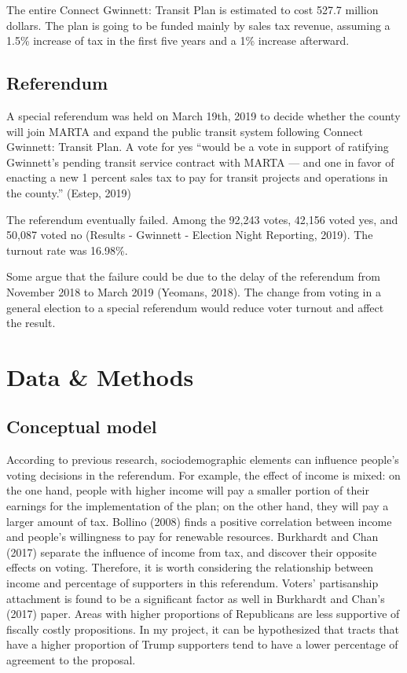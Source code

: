 \documentclass[
]{article}
\begin{document}
The entire Connect Gwinnett: Transit Plan is estimated to cost 527.7
million dollars. The plan is going to be funded mainly by sales tax
revenue, assuming a 1.5\% increase of tax in the first five years and a
1\% increase afterward.

\hypertarget{referendum}{%
\subsection{Referendum}\label{referendum}}

A special referendum was held on March 19th, 2019 to decide whether the
county will join MARTA and expand the public transit system following
Connect Gwinnett: Transit Plan. A vote for yes ``would be a vote in
support of ratifying Gwinnett's pending transit service contract with
MARTA --- and one in favor of enacting a new 1 percent sales tax to pay
for transit projects and operations in the county.'' (Estep, 2019)

The referendum eventually failed. Among the 92,243 votes, 42,156 voted
yes, and 50,087 voted no (Results - Gwinnett - Election Night Reporting,
2019). The turnout rate was 16.98\%.

Some argue that the failure could be due to the delay of the referendum
from November 2018 to March 2019 (Yeomans, 2018). The change from voting
in a general election to a special referendum would reduce voter turnout
and affect the result.

\hypertarget{data-methods}{%
\section{Data \& Methods}\label{data-methods}}

\hypertarget{conceptual-model}{%
\subsection{Conceptual model}\label{conceptual-model}}

According to previous research, sociodemographic elements can influence
people's voting decisions in the referendum. For example, the effect of
income is mixed: on the one hand, people with higher income will pay a
smaller portion of their earnings for the implementation of the plan; on
the other hand, they will pay a larger amount of tax. Bollino (2008)
finds a positive correlation between income and people's willingness to
pay for renewable resources. Burkhardt and Chan (2017) separate the
influence of income from tax, and discover their opposite effects on
voting. Therefore, it is worth considering the relationship between
income and percentage of supporters in this referendum. Voters'
partisanship attachment is found to be a significant factor as well in
Burkhardt and Chan's (2017) paper. Areas with higher proportions of
Republicans are less supportive of fiscally costly propositions. In my
project, it can be hypothesized that tracts that have a higher
proportion of Trump supporters tend to have a lower percentage of
agreement to the proposal.
\end{document}
